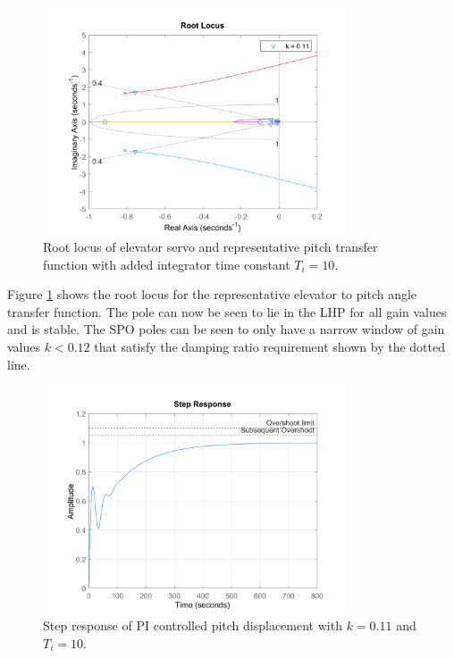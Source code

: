 \documentclass{article}
\begin{document}
\begin{figure}[H]
    \centering
    \includegraphics[width=0.8\textwidth]{figures/pitch_autopilot_locus_Ti.png}
    \caption{Root locus of elevator servo and representative pitch transfer function \cite{rep} with added integrator time constant $T_i = 10$.}
    \label{fig:representative_pitchrate_rlocus_int}
\end{figure}

Figure \ref{fig:representative_pitchrate_rlocus_int} shows the root locus for the representative elevator to pitch angle transfer function.
The pole can now be seen to lie in the LHP for all gain values and is stable.
The SPO poles can be seen to only have a narrow window of gain values $k < 0.12$ that satisfy the damping ratio requirement shown by the dotted line.

\begin{figure}[H]
    \centering
    \includegraphics[width=0.8\textwidth]{figures/pitch_autopilot_uncompensated_step.png}
    \caption{Step response of PI controlled pitch displacement with $k=0.11$ and $T_i = 10$.}
    \label{fig:pitch_autopilot_uncompensated_step}
\end{figure}
\end{document}
